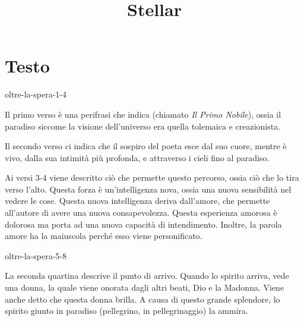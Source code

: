 \documentclass[preview]{standalone}
\begin{document}
\title{Stellar}
\genpage

\section{Testo}


\begin{snippet}{oltre-la-spera-1-4}

    Il primo verso è una perifrasi che indica  (chiamato \textit{Il Primo Nobile}), ossia il paradiso
    siccome la visione dell'universo era quella tolemaica e creazionista.
    
    Il secondo verso ci indica che il sospiro del poeta esce dal suo cuore, mentre è vivo, dalla sua intimità più profonda,
    e attraverso i cieli fino al paradiso.  
    
    Ai versi 3-4 viene descritto ciò che permette questo percorso, ossia ciò che lo tira
    verso l'alto. Questa forza è un'intelligenza nova, ossia una nuova sensibilità nel vedere le cose.
    Questa nuova intelligenza deriva dall'amore, che permette all'autore di avere una nuova consapevolezza.
    Questa esperienza amorosa è dolorosa ma porta ad una nuova capacità di intendimento.
    Inoltre, la parola amore ha la maiuscola perché esso viene personificato.
\end{snippet}

\begin{snippet}{oltre-la-spera-5-8}

    La seconda quartina descrive il punto di arrivo.
    Quando lo spirito arriva, vede una donna, la quale viene onorata dagli altri beati, Dio e la Madonna.
    Viene anche detto che questa donna brilla.
    A causa di questo grande splendore, lo spirito giunto in paradiso (pellegrino, in pellegrinaggio) la ammira.
\end{snippet}
\end{document}
